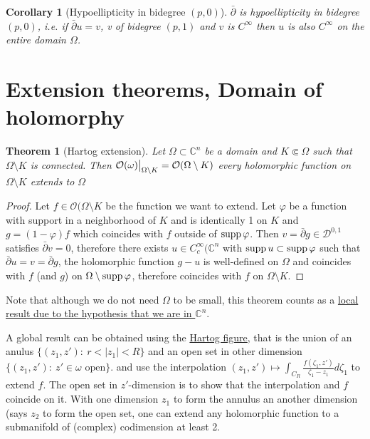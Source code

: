 \documentclass[11pt]{article}
\newtheorem{theorem}{Theorem}
\newtheorem{corollary}{Corollary}[theorem]
\newcommand{\supp}{\mathop{\rm supp}\nolimits}
\newcommand\restr[2]{{%
\left.\kern-\nulldelimiterspace %
#1 %
\vphantom{\big|} %
\right|_{#2} %
}}
\begin{document}
\begin{corollary}[Hypoellipticity in bidegree \((p,0)\)]
\(\bar \partial\) is hypoellipticity in bidegree \((p,0)\), i.e. if \(\bar \partial u
= v\), v of bidegree \((p,1)\) and \(v\) is \(C^\infty\) then \(u\) is also \(C^\infty\) on the entire domain \(\Omega\).
\end{corollary}


\section{Extension theorems, Domain of holomorphy}
\label{sec:org36f7626}

\begin{theorem}[Hartog extension]
\label{thm:hartog-ext}
Let \(\Omega \subset \mathbb{C}^n\) be a domain and \(K \Subset \Omega\) such that \(\Omega\setminus K\) is connected. Then \(\restr{\mathcal{O}(\omega)}{\Omega\setminus K} =
\mathcal{O}(\Omega\setminus K)\) every holomorphic function on \(\Omega\setminus K\) extends to \(\Omega\)
\end{theorem}
\begin{proof}
Let \(f\in \mathcal{O}(\Omega \setminus K\) be the function we want to extend. Let \(\varphi\) be a function with support in a neighborhood of \(K\) and is identically 1 on
\(K\) and \(g = (1-\varphi)f\) which coincides with \(f\) outside of \(\supp
\varphi\). Then \(v = \bar \partial g \in \mathcal{D}^{0,1}\) satisfies \(\bar
\partial v = 0\), therefore there exists \(u\in C_c^\infty(\mathbb{C}^n\) with \(\supp
u \subset \supp \varphi\) such that \(\bar \partial u = v = \bar \partial g\), the
holomorphic function \(g-u\) is well-defined on \(\Omega\) and coincides with \(f\)
(and \(g\)) on \(\Omega\setminus \supp\varphi\), therefore coincides with \(f\) on
\(\Omega\setminus K\).
\end{proof}

Note that although we do not need \(\Omega\) to be small, this theorem counts as a
\uline{local result due to the hypothesis that we are in \(\mathbb{C}^n\)}.


A global result can be obtained using the \href{https://en.wikipedia.org/wiki/Hartogs'\_extension\_theorem}{Hartog figure}, that is the union of an anulus \(\{ (z_1,z'):\ r < |z_1| <
R\}\) and an open set in other dimension \(\{ (z_1,z'):\ z'\in\omega \text{ open}\}\).
and use the interpolation \((z_1,z') \mapsto \int_{C_{R}} \frac{f(\zeta_1,z')}{\zeta_1-z_1}d\zeta_1\) to extend \(f\). The open set in \(z'\)-dimension is to show that the interpolation and \(f\)
coincide on it. With one dimension \(z_1\) to form the annulus an another dimension (says
\(z_2\) to form the open set, one can extend any holomorphic function to a submanifold
of (complex) codimension at least 2.
\end{document}
